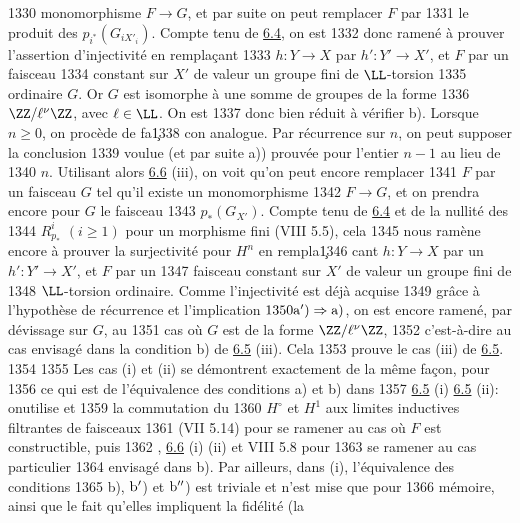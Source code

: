   1330	monomorphisme $F\rightarrow G$, et par suite on peut remplacer $F$ par
  1331	le produit des $p_{i^{\ast}}(G_{i X'_i})$. Compte tenu de \hyperref[XII.lem6.4]{6.4}, on est
  1332	donc ramené à prouver l'assertion d'injectivité en remplaçant
  1333	$h:Y\rightarrow X$ par $h':Y'\rightarrow X'$, et $F$ par un faisceau
  1334	constant sur $X'$ de valeur un groupe fini de $\LL$-torsion
  1335	ordinaire $G$. Or $G$ est isomorphe à une somme de groupes de la forme
  1336	$\ZZ/\ell^{\nu}\ZZ$, avec $\ell\in \LL$. On est
  1337	donc bien réduit à vérifier b). Lorsque $n\geq 0$, on procède de fa\c
  1338	con analogue. Par récurrence sur $n$, on peut supposer la conclusion
  1339	voulue (et par suite a)) prouvée pour l'entier $n-1$ au lieu de
  1340	$n$. Utilisant alors \hyperref[XII.cor6.6]{6.6} (iii), on voit qu'on peut encore remplacer
  1341	$F$ par un faisceau $G$ tel qu'il existe un monomorphisme
  1342	$F\rightarrow G$, et on prendra encore pour $G$ le faisceau
  1343	$p_{\ast}(G_{X'})$. Compte tenu de \hyperref[XII.lem6.4]{6.4} et de la nullité des
  1344	$R^{i}_{p_{\ast}}$ $(i\geq 1)$ pour un morphisme fini (VIII 5.5), cela
  1345	nous ramène encore à prouver la surjectivité pour $H^n$ en rempla\c
  1346	cant $h:Y\rightarrow X$ par un $h':Y'\rightarrow X'$, et $F$ par un
  1347	faisceau constant sur $X'$ de valeur un groupe fini de
  1348	$\LL$-torsion ordinaire. Comme l'injectivité est déjà acquise
  1349	grâce à l'hypothèse de récurrence et l'implication ${\rm
  1350	a')\Rightarrow a)}$, on est encore ramené, par dévissage sur $G$, au
  1351	cas où $G$ est de la forme $\ZZ/\ell^{\nu}\ZZ$,
  1352	c'est-à-dire au cas envisagé dans la condition b) de \hyperref[XII.prop6.5]{6.5} (iii). Cela
  1353	prouve le cas (iii) de \hyperref[XII.prop6.5]{6.5}.
  1354	
  1355	Les cas (i) et (ii) se démontrent exactement de la même façon, pour
  1356	ce qui est de l'équivalence des conditions a) et b) dans
  1357	\hyperref[XII.prop6.5]{6.5} (i) 	\hyperref[XII.prop6.5]{6.5} (ii): on\pageoriginale utilise  et
  1359	la commutation du 
  1360	$H^{\circ}$ et $H^1$ aux limites inductives filtrantes de faisceaux
  1361	(VII 5.14) pour se ramener au cas où $F$ est constructible, puis 
  1362	, \hyperref[XII.cor6.6]{6.6} (i) (ii) et VIII 5.8 pour 
  1363	se ramener au cas particulier
  1364	envisagé dans b). Par ailleurs, dans (i), l'équivalence des conditions
  1365	b), ${\rm b'}$) et ${\rm b''}$) est triviale et n'est mise que pour
  1366	mémoire, ainsi que le fait qu'elles impliquent la fidélité (\resp la
